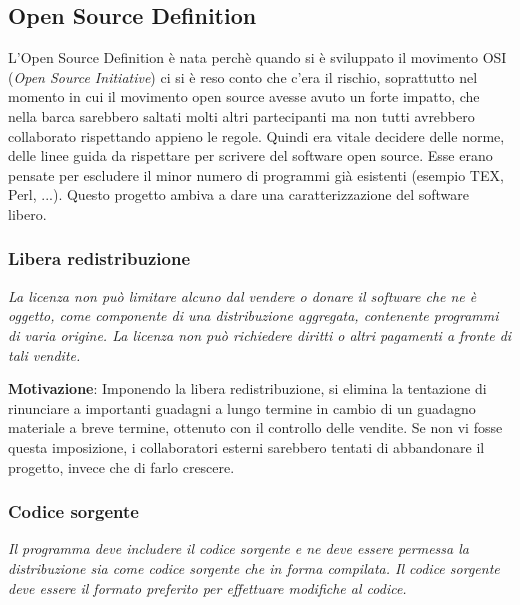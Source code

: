 \subsection{Open Source Definition}

L'Open Source Definition è nata perchè quando si è sviluppato il movimento OSI (\textit{Open Source Initiative}) ci si è reso conto che c'era il rischio, soprattutto nel momento in cui il movimento open source avesse avuto un forte impatto, che nella barca sarebbero saltati molti altri partecipanti ma non tutti avrebbero collaborato rispettando appieno le regole. Quindi era vitale decidere delle norme, delle linee guida da rispettare per scrivere del software open source. Esse erano pensate per escludere il minor numero di programmi già esistenti (esempio TEX, Perl, ...). Questo progetto ambiva a dare una caratterizzazione del software libero.

\subsubsection{Libera redistribuzione}

\begin{center}

\textit{La licenza non può limitare alcuno dal vendere o donare il software che ne è oggetto, come componente di una distribuzione aggregata, contenente programmi di varia origine. La licenza non può richiedere diritti o altri pagamenti a fronte di tali vendite.}

\end{center}

\textbf{Motivazione}: Imponendo la libera redistribuzione, si elimina la tentazione di rinunciare a importanti guadagni a lungo termine in cambio di un guadagno materiale a breve termine, ottenuto con il controllo delle vendite. Se non vi fosse questa imposizione, i collaboratori esterni sarebbero tentati di abbandonare il progetto, invece che di farlo crescere.

\subsubsection{Codice sorgente}

\begin{center}

\textit{Il programma deve includere il codice sorgente e ne deve essere permessa la distribuzione sia come codice sorgente che in forma compilata. Il codice sorgente deve essere il formato preferito per effettuare modifiche al codice.}

\end{center}

